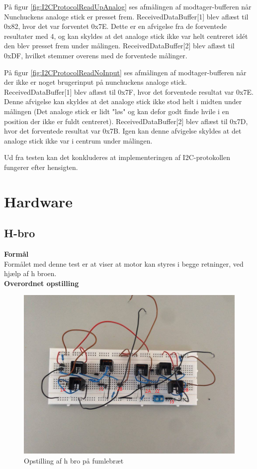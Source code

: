 På figur \ref{fig:I2CProtocolReadUpAnalog} ses afmålingen af modtager-bufferen når Nunchuckens analoge stick er presset frem. ReceivedDataBuffer[1] blev aflæst til 0x82, hvor det var forventet 0x7E. Dette er en afvigelse fra de forventede resultater med 4, og kan skyldes at det analoge stick ikke var helt centreret idét den blev presset frem under målingen. ReceivedDataBuffer[2] blev aflæst til 0xDF, hvilket stemmer overens med de forventede målinger.

På figur \ref{fig:I2CProtocolReadNoInput} ses afmålingen af modtager-bufferen når der ikke er noget brugerinput på nunchuckens analoge stick. ReceivedDataBuffer[1] blev aflæst til 0x7F, hvor det forventede resultat var 0x7E. Denne afvigelse kan skyldes at det analoge stick ikke stod helt i midten under målingen (Det analoge stick er lidt "løs" og kan defor godt finde hvile i en position der ikke er fuldt centreret). ReceivedDataBuffer[2] blev aflæst til 0x7D, hvor det forventede resultat var 0x7B. Igen kan denne afvigelse skyldes at det analoge stick ikke var i centrum under målingen.

Ud fra testen kan det konkluderes at implementeringen af I2C-protokollen fungerer efter hensigten.

\section{Hardware}
\subsection{H-bro} 

\textbf{Formål}
\\ Formålet med denne test er at viser at motor kan styres i begge retninger, ved hjælp af h broen.\\

\textbf{Overordnet opstilling}

\begin{figure}[H]
	\centering
	\includegraphics[width=\textwidth]{test/images/testhbroopst}
	\caption{Opstilling af h bro på fumlebræt}
\end{figure}

